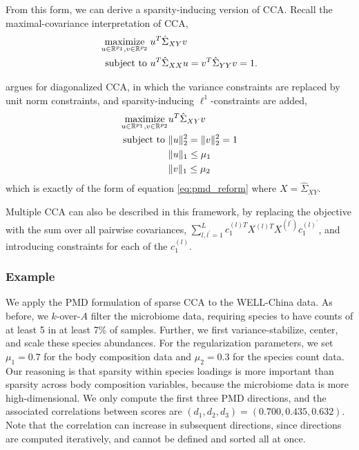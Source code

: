 \documentclass{article}
\begin{document}
From this form, we can derive a sparsity-inducing version of
CCA. Recall the maximal-covariance interpretation of CCA,
\begin{align*}
  \mathop\mathrm{maximize}_{u \in \mathbb{R}^{p_{1}}, v \in \mathbb{R}^{p_{2}}} \medspace &u^{T}\hat{\Sigma}_{XY}v \\
  \text{subject to } &u^{T}\hat{\Sigma}_{XX} u = v^{ T}\hat{\Sigma}_{YY}v = 1.
\end{align*}

\citep{witten2009penalized} argues for diagonalized CCA, in which the variance
constraints are replaced by unit norm constraints, and sparsity-inducing
$\ell^{1}$-constraints are added,
\begin{align*}
  \mathop\mathrm{maximize}_{u \in \mathbb{R}^{p_{1}}, v \in
    \mathbb{R}^{p_{2}}} & u^T\hat{\Sigma}_{XY}v  \\
  \text{subject to } &\|u\|_{2}^{2} = \|v\|_{2}^{2} = 1 \\
  &\|u\|_{1} \leq \mu_{1} \\
  &\|v\|_{1} \leq \mu_{2}
\end{align*}
which is exactly of the form of equation \ref{eq:pmd_reform} where $X =
\hat{\Sigma}_{XY}$.

Multiple CCA can also be described in this framework, by replacing the objective
with the sum over all pairwise covariances, $\sum_{l, l^{\prime} = 1}^{L}
c_{1}^{(l) T}X^{(l) T}X^{(l^{\prime})}c_{1}^{(l)^{\prime}}$, and introducing
constraints for each of the $c_{1}^{(l)}$.

\subsubsection{Example}
\label{subsec:sparse_cca_example}

We apply the PMD formulation of sparse CCA to the WELL-China data. As
before, we $k$-over-$A$ filter the microbiome data, requiring species to have
counts of at least 5 in at least 7\% of samples. Further, we first
variance-stabilize, center, and scale these species abundances. For the
regularization parameters, we set $\mu_1 = 0.7$ for the body composition data
and $\mu_2 = 0.3$ for the species count data. Our reasoning is that sparsity
within species loadings is more important than sparsity across body composition
variables, because the microbiome data is more high-dimensional. We only compute
the first three PMD directions, and the associated correlations between scores
are $\left(d_1, d_2, d_3\right) = \left(0.700, 0.435, 0.632\right)$. Note that
the correlation can increase in subsequent directions, since directions are
computed iteratively, and cannot be defined and sorted all at once.
\end{document}
